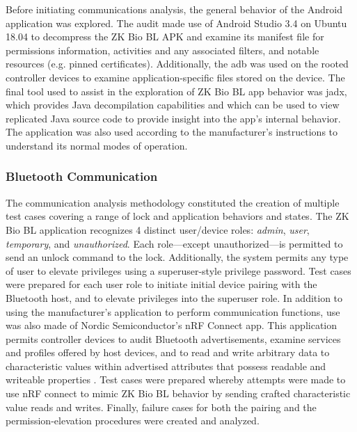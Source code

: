 \documentclass[conference]{IEEEtran}
\begin{document}
Before initiating communications analysis, the general behavior of the Android application was explored.  The audit made use of Android Studio 3.4 on Ubuntu 18.04 to decompress the ZK Bio BL APK and examine its manifest file for permissions information, activities and any associated filters, and notable resources (e.g. pinned certificates).  Additionally, the \gls{adb} was used on the rooted controller devices to examine application-specific files stored on the device.  The final tool used to assist in the exploration of ZK Bio BL app behavior was jadx, which provides Java decompilation capabilities  \cite{Skylot2018} and which can be used to view replicated Java source code to provide insight into the app's internal behavior.  The application was also used according to the manufacturer's instructions to understand its normal modes of operation.

\bigskip
\subsubsection{Bluetooth Communication}

The communication analysis methodology constituted the creation of multiple test cases covering a range of lock and application behaviors and states.  The ZK Bio BL application recognizes 4 distinct user/device roles: \textit{admin}, \textit{user}, \textit{temporary}, and \textit{unauthorized}.  Each role---except unauthorized---is permitted to send an unlock command to the lock.  Additionally, the system permits any type of user to elevate privileges using a superuser-style privilege password.  Test cases were prepared for each user role to initiate initial device pairing with the Bluetooth host, and to elevate privileges into the superuser role.  In addition to using the manufacturer's application to perform communication functions, use was also made of Nordic Semiconductor's nRF Connect app.  This application permits controller devices to audit Bluetooth advertisements, examine services and profiles offered by host devices, and to read and write arbitrary data to characteristic values within advertised attributes that possess readable and writeable properties \cite{NordicSemiconductor}.  Test cases were prepared whereby attempts were made to use nRF connect to mimic ZK Bio BL behavior by sending crafted characteristic value reads and writes.  Finally, failure cases for both the pairing and the permission-elevation procedures were created and analyzed.

\bigskip
\end{document}
